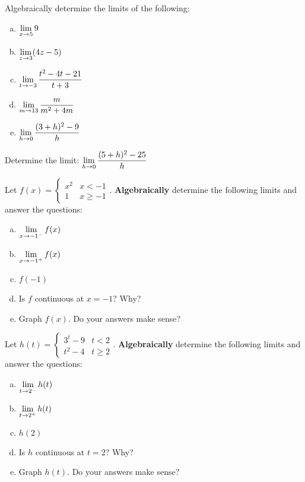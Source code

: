 \documentclass[notes]{subfiles}
\begin{document}
		\begin{ex}
			Algebraically determine the limits of the following:
			\begin{enumerate}[(a)]
				\item $\displaystyle\lim_{x\to 5} 9$
				\item $\displaystyle\lim_{z\to 3} (4z-5)$
				\item $\displaystyle\lim_{t\to -3} \dfrac{t^2-4t-21}{t+3}$
				\item $\displaystyle\lim_{m\to 13} \dfrac{m}{m^2+4m}$
				\item $\displaystyle\lim_{h\to 0} \dfrac{(3+h)^2 -9}{h}$
			\end{enumerate}
		\end{ex}
		
		\begin{ex}
			Determine the limit: $\displaystyle \lim_{h\to 0} \dfrac{(5+h)^2-25}{h}$
		\end{ex}
			\vs{1}
			\newpage

		\begin{ex}
			Let $f(x) = \begin{cases} x^2 & x < -1 \\ 1 & x\geq -1\end{cases}$.  \textbf{Algebraically} determine the following limits and answer the questions:
			\begin{enumerate}[(a)]
				\item $\displaystyle \lim_{x\to -1^-} f(x)$
					\vs{1}
				\item $\displaystyle \lim_{x\to -1^+} f(x)$
					\vs{1}
				\item $f(-1)$
					\vs{1}
				\item Is $f$ continuous at $x = -1$?  Why?
					\vs{1}
				\item Graph $f(x)$. Do your answers make sense?
					\vs{1}
			\end{enumerate}
		\end{ex}
			\newpage

		\begin{ex}
			Let $h(t) = \begin{cases} 3^t - 9 & t < 2 \\ t^2-4 & t\geq 2\end{cases}$.  \textbf{Algebraically} determine the following limits and answer the questions:
			\begin{enumerate}[(a)]
				\item $\displaystyle \lim_{t\to 2^-} h(t)$
				\item $\displaystyle \lim_{t\to 2^+} h(t)$
				\item $h(2)$
				\item Is $h$ continuous at $t = 2$?  Why?
				\item Graph $h(t)$. Do your answers make sense?
			\end{enumerate}
		\end{ex}
	\clearpage
\end{document}

